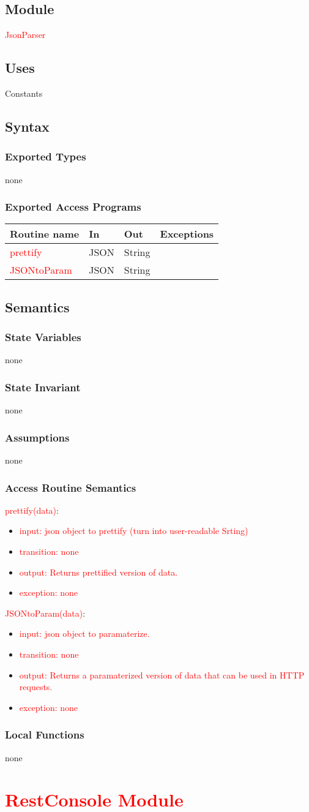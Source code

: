 \documentclass[12pt, titlepage]{article}
\newcommand{\newModule}[9]{
	\subsection* {Module}
		#1
	\subsection* {Uses}
		#2
	\subsection* {Syntax}
		\subsubsection* {Exported Types}
			#3
		\subsubsection* {Exported Access Programs}
			#4
	\subsection* {Semantics}
		\subsubsection* {State Variables}
			#5
		\subsubsection* {State Invariant}
			#6
		\subsubsection* {Assumptions}
			#7
		\subsubsection* {Access Routine Semantics}
			#8
		\subsubsection* {Local Functions}
			#9
}
\newcommand{\revAccessProgram}[5]{
	\noindent \textcolor{red}{#1}:
		\begin{itemize}
		    \item \textcolor{red}{input: #2}
			\item \textcolor{red}{transition: #3}
			\item \textcolor{red}{output: #4}
			\item \textcolor{red}{exception: #5}
		\end{itemize}
}
\newcommand{\row}[4]{#1 & #2 & #3 & #4 ~\\ \hline}
\newcommand{\accessProgramsTableStart}{
\begin{tabular}{| l | l | l | l |}
\hline
\textbf{Routine name} & \textbf{In} & \textbf{Out} & \textbf{Exceptions}\\
\hline
}
\newcommand{\accessProgramsTableEnd}{
	\end{tabular}
}
\begin{document}
\label{JsonParser}

\newModule{\textcolor{red}{JsonParser}}
	{%
		Constants
	}
	{%
		none
	}
	{%
		\accessProgramsTableStart
			\row{\textcolor{red}{prettify}}{JSON}{String}{}
			\row{\textcolor{red}{JSONtoParam}}{JSON}{String}{}
		\accessProgramsTableEnd
	}
	{%
		none \\
	}
	{%
        none
	}
	{%
		none
	}
	{%
		\revAccessProgram{prettify(data)}
			{%
				json object to prettify (turn into user-readable Srting)
			}
			{%
				none
			}
			{%
				Returns prettified version of data.
			}
			{%
				none
			}
		\revAccessProgram{JSONtoParam(data)}
			{%
				json object to paramaterize.
			}
			{%
				none
			}
			{%
				Returns a paramaterized version of data that can be used in HTTP requests.
			}
			{%
				none
			}
	}
	{%
		none
	}
	
\newpage

\section {\textcolor{red}{RestConsole Module}}
\end{document}
